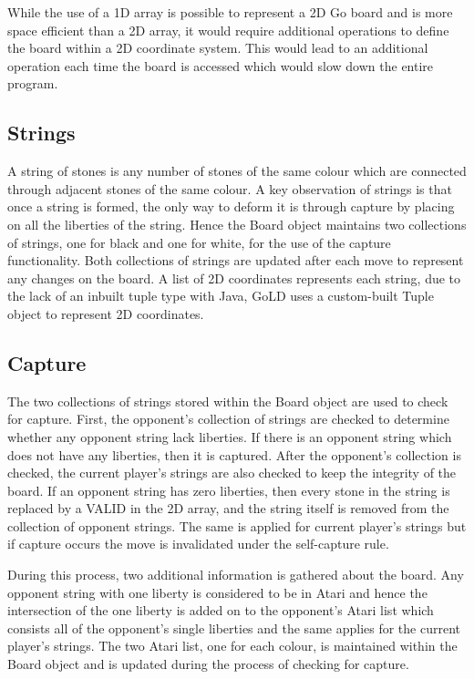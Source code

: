 \documentclass{l4proj}
\begin{document}
While the use of a 1D array is possible to represent a 2D Go board and is more space efficient than a 2D array, it would require additional operations to define the board within a 2D coordinate system. This would lead to an additional operation each time the board is accessed which would slow down the entire program.

\subsection{Strings}
A string of stones is any number of stones of the same colour which are connected through adjacent stones of the same colour. A key observation of strings is that once a string is formed, the only way to deform it is through capture by placing on all the liberties of the string. Hence the Board object maintains two collections of strings, one for black and one for white, for the use of the capture functionality. Both collections of strings are updated after each move to represent any changes on the board. A list of 2D coordinates represents each string, due to the lack of an inbuilt tuple type with Java, GoLD uses a custom-built Tuple object to represent 2D coordinates.

\subsection{Capture}
The two collections of strings stored within the Board object are used to check for capture. First, the opponent's collection of strings are checked to determine whether any opponent string lack liberties. If there is an opponent string which does not have any liberties, then it is captured. After the opponent's collection is checked, the current player's strings are also checked to keep the integrity of the board. If an opponent string has zero liberties, then every stone in the string is replaced by a VALID in the 2D array, and the string itself is removed from the collection of opponent strings. The same is applied for current player's strings but if capture occurs the move is invalidated under the self-capture rule.

During this process, two additional information is gathered about the board. Any opponent string with one liberty is considered to be in Atari and hence the intersection of the one liberty is added on to the opponent’s Atari list which consists all of the opponent’s single liberties and the same applies for the current player's strings. The two Atari list, one for each colour, is maintained within the Board object and is updated during the process of checking for capture.
\end{document}
